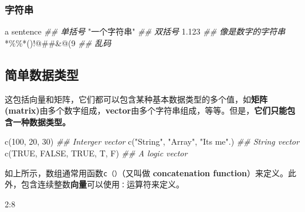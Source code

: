 \documentclass[
]{article}
\newenvironment{Shaded}{}{}
\newcommand{\ConstantTok}[1]{\textcolor[rgb]{0.53,0.00,0.00}{#1}}
\newcommand{\DecValTok}[1]{\textcolor[rgb]{0.25,0.63,0.44}{#1}}
\newcommand{\DocumentationTok}[1]{\textcolor[rgb]{0.73,0.13,0.13}{\textit{#1}}}
\newcommand{\FunctionTok}[1]{\textcolor[rgb]{0.02,0.16,0.49}{#1}}
\newcommand{\NormalTok}[1]{#1}
\newcommand{\SpecialCharTok}[1]{\textcolor[rgb]{0.25,0.44,0.63}{#1}}
\newcommand{\StringTok}[1]{\textcolor[rgb]{0.25,0.44,0.63}{#1}}
\begin{document}
\hypertarget{ux5b57ux7b26ux4e32}{%
\subsubsection{字符串}\label{ux5b57ux7b26ux4e32}}

\begin{Shaded}
\begin{Highlighting}[]
\StringTok{\textquotesingle{}a sentence\textquotesingle{}} \DocumentationTok{\#\# 单括号}
\StringTok{"一个字符串"} \DocumentationTok{\#\# 双括号}
\StringTok{\textquotesingle{}1.123\textquotesingle{}}      \DocumentationTok{\#\# 像是数字的字符串}
\StringTok{\textquotesingle{}*\%\%*()!@\#\#\&@(9\textquotesingle{}}  \DocumentationTok{\#\# 乱码}
\end{Highlighting}
\end{Shaded}

\hypertarget{ux7b80ux5355ux6570ux636eux7c7bux578b}{%
\subsection{简单数据类型}\label{ux7b80ux5355ux6570ux636eux7c7bux578b}}

这包括向量和矩阵，它们都可以包含某种基本数据类型的多个值，如\textbf{矩阵(matrix)}由多个数字组成，\textbf{vector}由多个字符串组成，等等。但是，\textbf{它们只能包含一种数据类型。}

\begin{Shaded}
\begin{Highlighting}[]
\FunctionTok{c}\NormalTok{(}\DecValTok{100}\NormalTok{, }\DecValTok{20}\NormalTok{, }\DecValTok{30}\NormalTok{) }\DocumentationTok{\#\# Interger vector }
\FunctionTok{c}\NormalTok{(}\StringTok{"String"}\NormalTok{, }\StringTok{"Array"}\NormalTok{, }\StringTok{"It\textquotesingle{}s me"}\NormalTok{.) }\DocumentationTok{\#\# String vector}
\FunctionTok{c}\NormalTok{(}\ConstantTok{TRUE}\NormalTok{, }\ConstantTok{FALSE}\NormalTok{, }\ConstantTok{TRUE}\NormalTok{, T, F) }\DocumentationTok{\#\# A logic vector}
\end{Highlighting}
\end{Shaded}

如上所示，数组通常用函数\texttt{c（）}（又叫做 \textbf{concatenation
function}）来定义。此外，包含连续整数\textbf{向量}可以使用\texttt{：}运算符来定义。

\begin{Shaded}
\begin{Highlighting}[]
\DecValTok{2}\SpecialCharTok{:}\DecValTok{8}
\end{Highlighting}
\end{Shaded}
\end{document}
